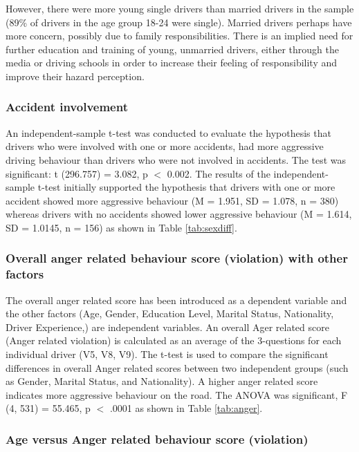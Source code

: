 \documentclass[preprint,12pt,a4paper,authoryear]{elsarticle}
\begin{document}
\begin{linenumbers}
However, there were more young single drivers than married drivers in the sample (89\% of drivers in the age group 18-24 were single). Married drivers perhaps have more concern, possibly due to family responsibilities. There is an implied need for further education and training of young, unmarried drivers, either through the media or driving schools in order to increase their feeling of responsibility and improve their hazard perception. 

\subsubsection{Accident involvement}

An independent-sample t-test was conducted to evaluate the hypothesis that drivers who were involved with one or more accidents, had more aggressive driving behaviour than drivers who were not involved in accidents. The test was significant: t (296.757) = 3.082, p $<$ 0.002. The results of the independent-sample t-test initially supported the hypothesis that drivers with one or more accident showed more aggressive behaviour (M = 1.951, SD = 1.078, n = 380) whereas drivers with no accidents showed lower aggressive behaviour (M = 1.614, SD = 1.0145,  n = 156) as shown in Table \ref{tab:sexdiff}.

\subsubsection{Overall anger related behaviour score (violation) with other factors}

The overall anger related score has been introduced as a dependent variable and the other factors (Age, Gender, Education Level, Marital Status, Nationality, Driver Experience,) are independent variables. An overall Ager related score (Anger related violation) is calculated as an average of the 3-questions for each individual driver (V5, V8, V9).  The t-test is used to compare the significant differences in overall Anger related scores between two independent groups (such as Gender, Marital Status,  and Nationality). A higher anger related score indicates more aggressive behaviour on the road. The ANOVA was significant, F (4, 531) = 55.465, p $<$ .0001 as shown in Table \ref{tab:anger}.

\subsubsection{Age versus Anger related behaviour score (violation)}


\end{linenumbers}
\end{document}
